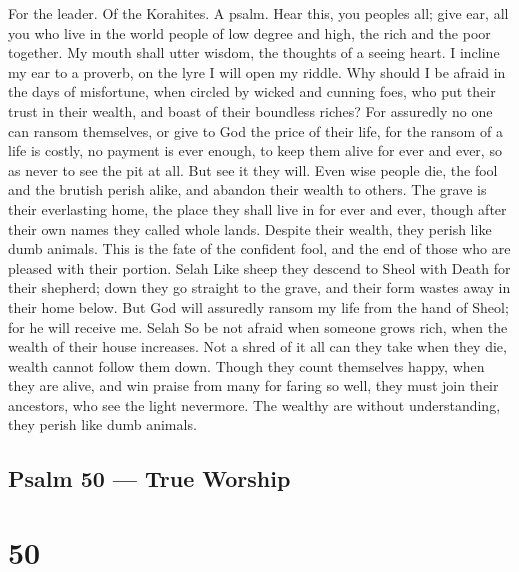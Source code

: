For the leader. Of the Korahites. A psalm.  Hear this, you
peoples all; give ear, all you who live in the world  people
of low degree and high, the rich and the poor together.  My
mouth shall utter wisdom, the thoughts of a seeing heart.  I
incline my ear to a proverb, on the lyre I will open my riddle.
 Why should I be afraid in the days of misfortune, when
circled by wicked and cunning foes,  who put their trust in
their wealth, and boast of their boundless riches?  For
assuredly no one can ransom themselves, or give to God the price of
their life,  for the ransom of a life is costly, no payment
is ever enough,  to keep them alive for ever and ever, so as
never to see the pit at all.  But see it they will. Even
wise people die, the fool and the brutish perish alike, and abandon
their wealth to others.  The grave is their everlasting
home, the place they shall live in for ever and ever, though after their
own names they called whole lands.  Despite their wealth,
they perish like dumb animals.  This is the fate of the
confident fool, and the end of those who are pleased with their portion.
Selah  Like sheep they descend to Sheol with Death for
their shepherd; down they go straight to the grave, and their form
wastes away in their home below.  But God will assuredly
ransom my life from the hand of Sheol; for he will receive me. Selah
 So be not afraid when someone grows rich, when the wealth
of their house increases.  Not a shred of it all can they
take when they die, wealth cannot follow them down.  Though
they count themselves happy, when they are alive, and win praise from
many for faring so well,  they must join their ancestors,
who see the light nevermore.  The wealthy are without
understanding, they perish like dumb animals.

\hypertarget{psalm-50-true-worship}{%
\subsection{Psalm 50 --- True Worship}\label{psalm-50-true-worship}}

\hypertarget{section-49}{%
\section{50}\label{section-49}}

